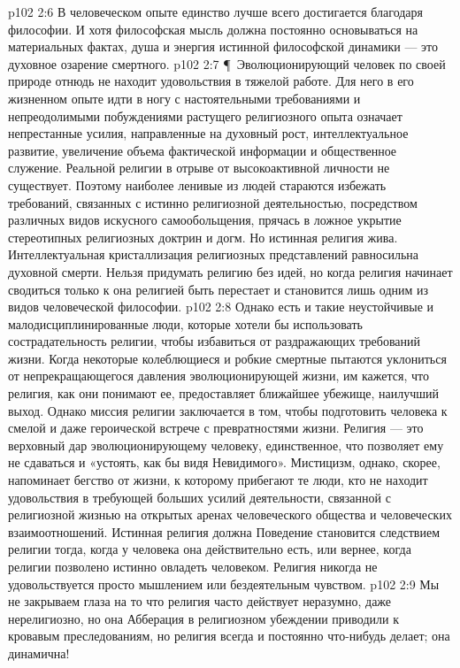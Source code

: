 \vs p102 2:6 В человеческом опыте единство лучше всего достигается благодаря философии. И хотя философская мысль должна постоянно основываться на материальных фактах, душа и энергия истинной философской динамики --- это духовное озарение смертного.
\vs p102 2:7 \P\ Эволюционирующий человек по своей природе отнюдь не находит удовольствия в тяжелой работе. Для него в его жизненном опыте идти в ногу с настоятельными требованиями и непреодолимыми побуждениями растущего религиозного опыта означает непрестанные усилия, направленные на духовный рост, интеллектуальное развитие, увеличение объема фактической информации и общественное служение. Реальной религии в отрыве от высокоактивной личности не существует. Поэтому наиболее ленивые из людей стараются избежать требований, связанных с истинно религиозной деятельностью, посредством различных видов искусного самообольщения, прячась в ложное укрытие стереотипных религиозных доктрин и догм. Но истинная религия жива. Интеллектуальная кристаллизация религиозных представлений равносильна духовной смерти. Нельзя придумать религию без идей, но когда религия начинает сводиться только к  она религией быть перестает и становится лишь одним из видов человеческой философии.
\vs p102 2:8 Однако есть и такие неустойчивые и малодисциплинированные люди, которые хотели бы использовать сострадательность религии, чтобы избавиться от раздражающих требований жизни. Когда некоторые колеблющиеся и робкие смертные пытаются уклониться от непрекращающегося давления эволюционирующей жизни, им кажется, что религия, как они понимают ее, предоставляет ближайшее убежище, наилучший выход. Однако миссия религии заключается в том, чтобы подготовить человека к смелой и даже героической встрече с превратностями жизни. Религия --- это верховный дар эволюционирующему человеку, единственное, что позволяет ему не сдаваться и «устоять, как бы видя Невидимого». Мистицизм, однако, скорее, напоминает бегство от жизни, к которому прибегают те люди, кто не находит удовольствия в требующей больших усилий деятельности, связанной с религиозной жизнью на открытых аренах человеческого общества и человеческих взаимоотношений. Истинная религия должна  Поведение становится следствием религии тогда, когда у человека она действительно есть, или вернее, когда религии позволено истинно овладеть человеком. Религия никогда не удовольствуется просто мышлением или бездеятельным чувством.
\vs p102 2:9 Мы не закрываем глаза на то что религия часто действует неразумно, даже нерелигиозно, но она  Абберация в религиозном убеждении приводили к кровавым преследованиям, но религия всегда и постоянно что\hyp{}нибудь делает; она динамична!
